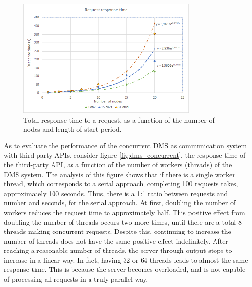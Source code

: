 \begin{figure}
  \centering
  \includegraphics[width=9cm]{./imgs/response_time.png}
  \caption{Total response time to a request, as a function of the number of nodes and length of start period.}
  \label{fig:response_time}  
\end{figure}


As to evaluate the performance of the concurrent DMS as communication system with third party APIs, consider figure \ref{fig:dms_concurrent}, the response time of the third-party API, as a function of the number of workers (threads) of the DMS system.
The analysis of this figure shows that if there is a single worker thread, which corresponds to a
serial approach, completing 100 requests takes, approximately 100 seconds. Thus, there is a 1:1 ratio
between requests and number and seconds, for the serial approach. At first, doubling the number of
workers reduces the request time to approximately half. This positive effect from doubling the number of
threads occurs two more times, until there are a total 8 threads making concurrent requests.
Despite this, continuing to increase the number of threads does not have the same positive effect
indefinitely. After reaching a reasonable number of threads, the server through-output stops to increase
in a linear way. In fact, having 32 or 64 threads leads to almost the same response time. This is because
the server becomes overloaded, and is not capable of processing all requests in a truly parallel way.





